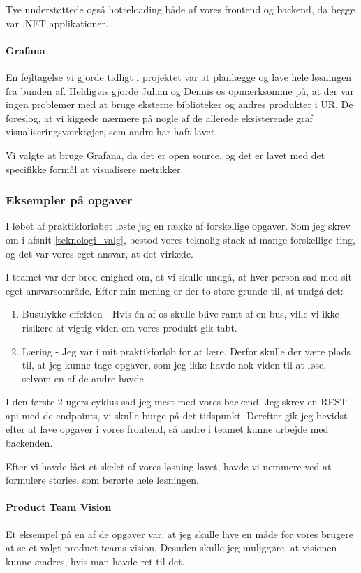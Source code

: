 \documentclass[a4paper]{article}
\begin{document}
Tye understøttede også hotreloading både af vores frontend og backend,
da begge var .NET applikationer.

\paragraph{Grafana}
En fejltagelse vi gjorde tidligt i projektet var at planlægge og lave hele løsningen fra bunden af.
Heldigvis gjorde Julian og Dennis os opmærksomme på,
at der var ingen problemer med at bruge eksterne biblioteker og andres produkter i UR.
De foreslog, at vi kiggede nærmere på nogle af de allerede eksisterende graf visualiseringsværktøjer,
som andre har haft lavet.

Vi valgte at bruge Grafana, da det er open source, og det er lavet med det specifikke formål at visualisere metrikker.

\subsubsection{Eksempler på opgaver}
I løbet af praktikforløbet løste jeg en række af forskellige opgaver.
Som jeg skrev om i afsnit \ref{teknologi_valg},
bestod vores teknolig stack af mange forskellige ting, og det var vores eget ansvar,
at det virkede.

I teamet var der bred enighed om, at vi skulle undgå, 
at hver person sad med sit eget ansvarsområde.
Efter min mening er der to store grunde til,
at undgå det:

\begin{enumerate}
    \item Busulykke effekten - Hvis én af os skulle blive ramt af en bus,
     ville vi ikke risikere at vigtig viden om vores produkt gik tabt.
    \item Læring - Jeg var i mit praktikforløb for at lære.
    Derfor skulle der være plads til,
    at jeg kunne tage opgaver,
    som jeg ikke havde nok viden til at løse, selvom en af de andre havde.
\end{enumerate}

I den første 2 ugers cyklus sad jeg mest med vores backend.
Jeg skrev en REST api med de endpoints, vi skulle burge på det tidspunkt.
Derefter gik jeg bevidst efter at lave opgaver i vores frontend,
så andre i teamet kunne arbejde med backenden.

Efter vi havde fået et skelet af vores løsning lavet,
havde vi nemmere ved at formulere stories, som berørte hele løsningen.

\paragraph{Product Team Vision}
Et eksempel på en af de opgaver var,
at jeg skulle lave en måde for vores brugere at se et valgt product teams vision.
Desuden skulle jeg muliggøre, at visionen kunne ændres,
hvis man havde ret til det.
\end{document}
